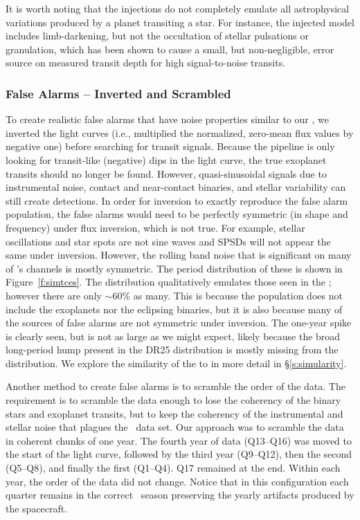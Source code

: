 It is worth noting that the injections do not completely emulate all astrophysical variations produced by a planet transiting a star.  For instance, the injected model includes limb-darkening, but not the occultation of stellar pulsations or granulation, which has been shown to cause a small, but non-negligible, error source on measured transit depth \citep{Chiavassa2017} for high signal-to-noise transits.  


\subsubsection{False Alarms -- Inverted and Scrambled} 

To create realistic false alarms that have noise properties similar to our , we inverted the light curves (i.e., multiplied the normalized, zero-mean flux values by negative one) before searching for transit signals. Because the pipeline is only looking for transit-like (negative) dips in the light curve, the true exoplanet transits should no longer be found. However, quasi-sinusoidal signals due to instrumental noise, contact and near-contact binaries, and stellar variability can still create detections. In order for inversion to exactly reproduce the false alarm population, the false alarms would need to be perfectly symmetric (in shape and frequency) under flux inversion, which is not true. For example, stellar oscillations and star spots are not sine waves and SPSDs will not appear the same under inversion. However, the rolling band noise that is significant on many of \Kepler's channels is mostly symmetric.  The period distribution of these  is shown in Figure~\ref{f:simtces}. The distribution qualitatively emulates those seen in the ; however there are only $\sim$60\% as many.  This is because the population does not include the exoplanets nor the eclipsing binaries, but it is also because many of the sources of false alarms are not symmetric under inversion.  The one-year spike is clearly seen, but is not as large as we might expect, likely because the broad long-period hump present in the DR25 \opstce{} distribution is mostly missing from the \invtce{} distribution. We explore the similarity of the  to  in more detail in \S\ref{s:simularity}.

Another method to create false alarms is to scramble the order of the data. The requirement is to scramble the data enough to lose the coherency of the binary stars and exoplanet transits, but to keep the coherency of the instrumental and stellar noise that plagues the \Kepler\ data set. Our approach was to scramble the data in coherent chunks of one year. The fourth year of data (Q13--Q16) was moved to the start of the light curve, followed by the third year (Q9--Q12), then the second (Q5--Q8), and finally the first (Q1--Q4). Q17 remained at the end. Within each year, the order of the data did not change. Notice that in this configuration each quarter remains in the correct \Kepler\ season preserving the yearly artifacts produced by the spacecraft. 


